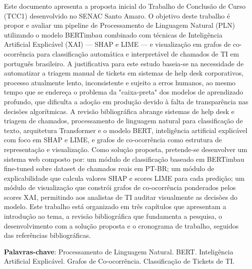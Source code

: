 \documentclass[
    12pt,                %
    openright,           %
    oneside,             %
    a4paper,             %
    english,             %
    brazil               %
]{abntex2}
\begin{document}
\begin{resumo}
Este documento apresenta a proposta inicial do Trabalho de Conclusão de Curso (TCC1) desenvolvido no SENAC Santo Amaro. O objetivo deste trabalho é propor e avaliar um pipeline de Processamento de Linguagem Natural (PLN) utilizando o modelo BERTimbau combinado com técnicas de Inteligência Artificial Explicável (XAI) — SHAP e LIME — e visualização em grafos de co-ocorrência para classificação automática e interpretável de chamados de TI em português brasileiro. A justificativa para este estudo baseia-se na necessidade de automatizar a triagem manual de tickets em sistemas de help desk corporativos, processo atualmente lento, inconsistente e sujeito a erros humanos, ao mesmo tempo que se endereça o problema da "caixa-preta" dos modelos de aprendizado profundo, que dificulta a adoção em produção devido à falta de transparência nas decisões algorítmicas. A revisão bibliográfica abrange sistemas de help desk e triagem de chamados, processamento de linguagem natural para classificação de texto, arquitetura Transformer e o modelo BERT, inteligência artificial explicável com foco em SHAP e LIME, e grafos de co-ocorrência como estrutura de representação e visualização. Como solução proposta, pretende-se desenvolver um sistema web composto por: um módulo de classificação baseado em BERTimbau fine-tuned sobre dataset de chamados reais em PT-BR; um módulo de explicabilidade que calcula valores SHAP e scores LIME para cada predição; um módulo de visualização que constrói grafos de co-ocorrência ponderados pelos scores XAI, permitindo aos analistas de TI auditar visualmente as decisões do modelo. Este trabalho está organizado em três capítulos que apresentam a introdução ao tema, a revisão bibliográfica que fundamenta a pesquisa, o desenvolvimento com a solução proposta e o cronograma de trabalho, seguidos das referências bibliográficas.

\vspace{\onelineskip}

\noindent
\textbf{Palavras-chave}: Processamento de Linguagem Natural. BERT. Inteligência Artificial Explicável. Grafos de Co-ocorrência. Classificação de Tickets de TI.
\end{resumo}

\end{document}
